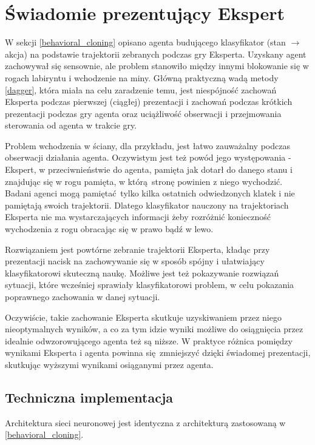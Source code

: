 \section{Świadomie prezentujący Ekspert}\label{presenting_expert}
W sekcji \ref{behavioral_cloning} opisano agenta budującego klasyfikator (stan $\to$ akcja) na podstawie trajektorii zebranych podczas gry Eksperta. Uzyskany agent zachowywał się sensownie, ale problem stanowiło między innymi blokowanie się w rogach labiryntu i wchodzenie na miny. Główną praktyczną wadą metody \ref{dagger}, która miała na celu zaradzenie temu, jest niespójność zachowań Eksperta podczas pierwszej (ciągłej) prezentacji i zachowań podczas krótkich prezentacji podczas gry agenta oraz uciążliwość obserwacji i przejmowania sterowania od agenta w trakcie gry.

Problem wchodzenia w ściany, dla przykładu, jest łatwo zauważalny podczas obserwacji działania agenta. Oczywistym jest też powód jego występowania - Ekspert, w przeciwnieństwie do agenta, pamięta jak dotarł do danego stanu i znajdując się w rogu pamięta, w którą stronę powinien z niego wychodzić. Badani agenci mogą pamiętać tylko kilka ostatnich odwiedzonych klatek i nie pamiętają swoich trajektorii. Dlatego klasyfikator nauczony na trajektoriach Eksperta nie ma wystarczających informacji żeby rozróżnić konieczność wychodzenia z rogu obracając się w prawo bądź w lewo.

Rozwiązaniem jest powtórne zebranie trajektorii Eksperta, kładąc przy prezentacji nacisk na zachowywanie się w sposób spójny i ułatwiający klasyfikatorowi skuteczną naukę. Możliwe jest też pokazywanie rozwiązań sytuacji, które wcześniej sprawiały klasyfikatorowi problem, w celu pokazania poprawnego zachowania w danej sytuacji.

Oczywiście, takie zachowanie Eksperta skutkuje uzyskiwaniem przez niego nieoptymalnych wyników, a co za tym idzie wyniki możliwe do osiągnięcia przez idealnie odwzorowującego agenta też są niższe. W praktyce różnica pomiędzy wynikami Eksperta i agenta powinna się zmniejszyć dzięki świadomej prezentacji, skutkując wyższymi wynikami osiąganymi przez agenta.

\subsection{Techniczna implementacja}

Architektura sieci neuronowej jest identyczna z architekturą zastosowaną w \ref{behavioral_cloning}.

